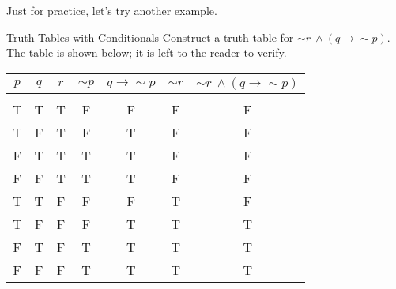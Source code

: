 Just for practice, let's try another example.

\begin{example}[https://www.youtube.com/watch?v=UDSeXDm9rfo]{Truth Tables with Conditionals}
Construct a truth table for $\sim r\ \wedge (q \to \sim p)$.\\

The table is shown below; it is left to the reader to verify.
\begin{center}
\begin{tabular}{|c c c c c c c|}
\hline
$p$ & $q$ & $r$ & $\sim p$ & $q \to \sim p$ & $\sim r$ & $\sim r\ \wedge (q \to \sim p)$\\
\hline
& & & & & &\\
T & T & T & F & F & F & F\\
T & F & T & F & T & F & F\\
F & T & T & T & T & F & F\\
F & F & T & T & T & F & F\\
T & T & F & F & F & T & F\\
T & F & F & F & T & T & T\\
F & T & F & T & T & T & T\\
F & F & F & T & T & T & T\\
\hline
\end{tabular}
\end{center}
\end{example}
\vfill
\pagebreak


